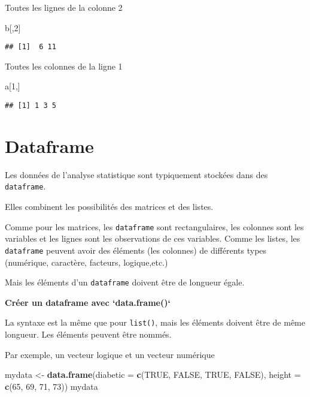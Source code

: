 \documentclass[]{book}
\newenvironment{Shaded}{\begin{snugshade}}{\end{snugshade}}
\newcommand{\DataTypeTok}[1]{\textcolor[rgb]{0.13,0.29,0.53}{#1}}
\newcommand{\DecValTok}[1]{\textcolor[rgb]{0.00,0.00,0.81}{#1}}
\newcommand{\KeywordTok}[1]{\textcolor[rgb]{0.13,0.29,0.53}{\textbf{#1}}}
\newcommand{\NormalTok}[1]{#1}
\newcommand{\OtherTok}[1]{\textcolor[rgb]{0.56,0.35,0.01}{#1}}
\newcommand{\StringTok}[1]{\textcolor[rgb]{0.31,0.60,0.02}{#1}}
\begin{document}
Toutes les lignes de la colonne 2

\begin{Shaded}
\begin{Highlighting}[]
\NormalTok{b[,}\DecValTok{2}\NormalTok{]}
\end{Highlighting}
\end{Shaded}

\begin{verbatim}
## [1]  6 11
\end{verbatim}

Toutes les colonnes de la ligne 1

\begin{Shaded}
\begin{Highlighting}[]
\NormalTok{a[}\DecValTok{1}\NormalTok{,]}
\end{Highlighting}
\end{Shaded}

\begin{verbatim}
## [1] 1 3 5
\end{verbatim}

\hypertarget{dataframe-1}{%
\section{Dataframe}\label{dataframe-1}}

Les données de l'analyse statistique sont typiquement stockées dans des \texttt{dataframe}.

Elles combinent les possibilités des matrices et des listes.

Comme pour les matrices, les \texttt{dataframe} sont rectangulaires, les colonnes sont les variables et les lignes sont les observations de ces variables.
Comme les listes, les \texttt{dataframe} peuvent avoir des éléments (les colonnes) de différents types (numérique, caractère, facteurs, logique,etc.)

Mais les éléments d'un \texttt{dataframe} doivent être de longueur égale.

\textbf{Créer un dataframe avec `data.frame()`}

La syntaxe est la même que pour \texttt{list()}, mais les éléments doivent être de même longueur.
Les éléments peuvent être nommés.

Par exemple, un vecteur logique et un vecteur numérique

\begin{Shaded}
\begin{Highlighting}[]
\NormalTok{mydata <-}\StringTok{ }\KeywordTok{data.frame}\NormalTok{(}\DataTypeTok{diabetic =} \KeywordTok{c}\NormalTok{(}\OtherTok{TRUE}\NormalTok{, }\OtherTok{FALSE}\NormalTok{, }\OtherTok{TRUE}\NormalTok{, }\OtherTok{FALSE}\NormalTok{), }
                     \DataTypeTok{height =} \KeywordTok{c}\NormalTok{(}\DecValTok{65}\NormalTok{, }\DecValTok{69}\NormalTok{, }\DecValTok{71}\NormalTok{, }\DecValTok{73}\NormalTok{))}
\NormalTok{mydata}
\end{Highlighting}
\end{Shaded}
\end{document}
